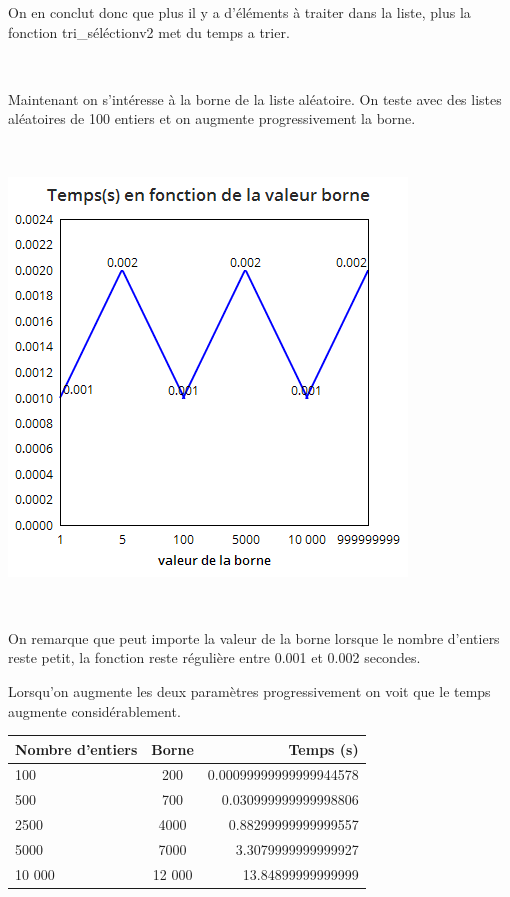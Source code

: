 \documentclass[a4paper, 12pt]{article}
\begin{document}
On en conclut donc que plus il y a d'éléments à traiter dans la liste, plus la fonction tri\_séléctionv2 met du temps a trier.

~

Maintenant on s'intéresse à la borne de la liste aléatoire. On teste avec des listes aléatoires de 100 entiers et on augmente progressivement la borne.

~

\begin{center}
\includegraphics[scale=0.5]{triselB.png}
\end{center}
~

On remarque que peut importe la valeur de la borne lorsque le nombre d'entiers reste petit, la fonction reste régulière entre 0.001 et 0.002 secondes. 

Lorsqu'on augmente les deux paramètres progressivement on voit que le temps augmente considérablement.

\begin{table}[htbp]
  \centering
  \begin{tabular}{||l|c|r||}\hline
    \textbf{Nombre d'entiers} & \textbf{Borne} & \textbf{Temps (s)}\\\hline\hline
    100                     &    200                  & 0.00099999999999944578              \\\hline
    500                 & 700               & 0.030999999999998806                \\\hline
    2500                 & 4000             & 0.88299999999999557                 \\\hline
    5000                & 7000             & 3.3079999999999927  \\\hline
    10 000                 & 12 000         & 13.84899999999999 \\\hline
  \end{tabular}
  \label{tableausel}
\end{table}
\end{document}
